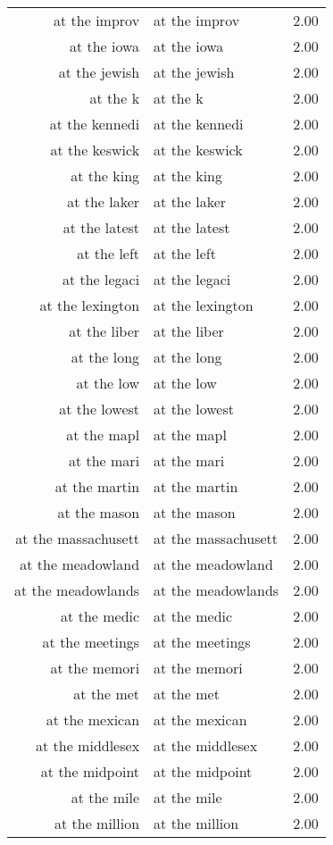 \begin{table}[ht]
\begin{tabular}{rlr}
  at the improv & at the improv & 2.00 \\ 
  at the iowa & at the iowa & 2.00 \\ 
  at the jewish & at the jewish & 2.00 \\ 
  at the k & at the k & 2.00 \\ 
  at the kennedi & at the kennedi & 2.00 \\ 
  at the keswick & at the keswick & 2.00 \\ 
  at the king & at the king & 2.00 \\ 
  at the laker & at the laker & 2.00 \\ 
  at the latest & at the latest & 2.00 \\ 
  at the left & at the left & 2.00 \\ 
  at the legaci & at the legaci & 2.00 \\ 
  at the lexington & at the lexington & 2.00 \\ 
  at the liber & at the liber & 2.00 \\ 
  at the long & at the long & 2.00 \\ 
  at the low & at the low & 2.00 \\ 
  at the lowest & at the lowest & 2.00 \\ 
  at the mapl & at the mapl & 2.00 \\ 
  at the mari & at the mari & 2.00 \\ 
  at the martin & at the martin & 2.00 \\ 
  at the mason & at the mason & 2.00 \\ 
  at the massachusett & at the massachusett & 2.00 \\ 
  at the meadowland & at the meadowland & 2.00 \\ 
  at the meadowlands & at the meadowlands & 2.00 \\ 
  at the medic & at the medic & 2.00 \\ 
  at the meetings & at the meetings & 2.00 \\ 
  at the memori & at the memori & 2.00 \\ 
  at the met & at the met & 2.00 \\ 
  at the mexican & at the mexican & 2.00 \\ 
  at the middlesex & at the middlesex & 2.00 \\ 
  at the midpoint & at the midpoint & 2.00 \\ 
  at the mile & at the mile & 2.00 \\ 
  at the million & at the million & 2.00 \\ 

\end{tabular}
\end{table}
